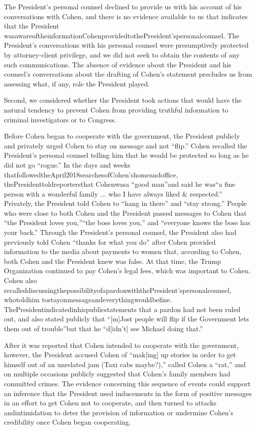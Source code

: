 {The President's personal counsel declined to provide us with his account of his conversations with Cohen, and there is no evidence available to us that indicates that the President wasawareoftheinformationCohenprovidedtothePresident'spersonalcounsel.
The President's conversations with his personal counsel were presumptively protected by attorney-client privilege, and we did not seek to obtain the contents of any such communications.
The absence of evidence about the President and his counsel's conversations about the drafting of Cohen's statement precludes us from assessing what, if any, role the President played.

Second, we considered whether the President took actions that would have the natural tendency to prevent Cohen from providing truthful information to criminal investigators or to Congress.

Before Cohen began to cooperate with the government, the President publicly and privately urged Cohen to stay on message and not “flip.” Cohen recalled the President's personal counsel telling him that he would be protected so long as he did not go “rogue.”
In the days and weeks thatfollowedtheApril2018searchesofCohen'shomeandoffice, thePresidenttoldreportersthat Cohenwasa “good man”and said he was“a fine person with a wonderful family ... who I have always liked & respected.”
Privately, the President told Cohen to “hang in there” and “stay strong.” People who were close to both Cohen and the President passed messages to Cohen that “the President loves you,”“the boss loves you,” and “everyone knows the boss has your back.”
Through the President's personal counsel, the President also had previously told Cohen “thanks for what you do” after Cohen provided information to the media about payments to women that, according to Cohen, both Cohen and the President knew was false.
At that time, the Trump Organization continued to pay Cohen's legal fees, which was important to Cohen.
Cohen also recalleddiscussingthepossibilityofapardonwiththePresident'spersonalcounsel, whotoldhim tostayonmessageandeverythingwouldbefine.
ThePresidentindicatedinhispublicstatements that a pardon had not been ruled out, and also stated publicly that “[m]Jost people will flip if the Government lets them out of trouble”but that he “d[idn't] see Michael doing that.”

After it was reported that Cohen intended to cooperate with the government, however, the President accused Cohen of “mak[ing] up stories in order to get himself out of an unrelated jam (Taxi cabs maybe?),” called Cohen a “rat,” and on multiple occasions publicly suggested that Cohen's family members had committed crimes.
The evidence concerning this sequence of events could support an inference that the President used inducements in the form of positive messages in an effort to get Cohen not to cooperate, and then turned to attacks andintimidation to deter the provision of information or undermine Cohen's credibility once Cohen began cooperating.

}
